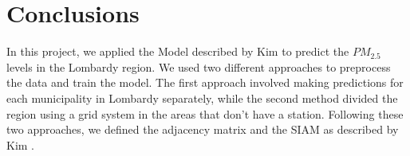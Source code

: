 \documentclass[11pt,a4paper]{article}
\begin{document}



\section{Conclusions}
\label{sec:End}







In this project, we applied the Model described by Kim \cite{Kim_2022} to predict the $PM_{2.5}$ levels in the Lombardy region. We used two different approaches to preprocess the data and train the model. The first approach involved making predictions for each municipality in Lombardy separately, while the second method divided the region using a grid system in the areas that don't have a station. Following these two approaches, we defined the adjacency matrix and the SIAM as described by Kim \cite{Kim_2022}.
\end{document}
